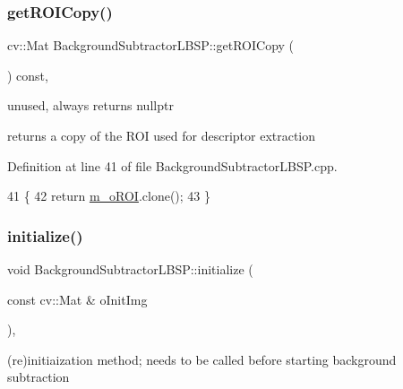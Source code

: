 \subsubsection{\texorpdfstring{get\+R\+O\+I\+Copy()}{getROICopy()}}
{\footnotesize\ttfamily cv\+::\+Mat Background\+Subtractor\+L\+B\+S\+P\+::get\+R\+O\+I\+Copy (\begin{DoxyParamCaption}{ }\end{DoxyParamCaption}) const\hspace{0.3cm}{\ttfamily [virtual]}, {\ttfamily [inherited]}}



unused, always returns nullptr 

returns a copy of the R\+OI used for descriptor extraction 

Definition at line 41 of file Background\+Subtractor\+L\+B\+S\+P.\+cpp.


\begin{DoxyCode}
41                                                  \{
42     \textcolor{keywordflow}{return} \mbox{\hyperlink{class_background_subtractor_l_b_s_p_a53fe98bd2489d95de5292467145901e9}{m\_oROI}}.clone();
43 \}
\end{DoxyCode}
\mbox{\label{class_background_subtractor_l_b_s_p_ac6b854f94414497b143375d4a0ae8b6f}} 
\subsubsection{\texorpdfstring{initialize()}{initialize()}\hspace{0.1cm}{\footnotesize\ttfamily [1/2]}}
{\footnotesize\ttfamily void Background\+Subtractor\+L\+B\+S\+P\+::initialize (\begin{DoxyParamCaption}\item[{const cv\+::\+Mat \&}]{o\+Init\+Img }\end{DoxyParamCaption})\hspace{0.3cm}{\ttfamily [virtual]}, {\ttfamily [inherited]}}



(re)initiaization method; needs to be called before starting background subtraction 



